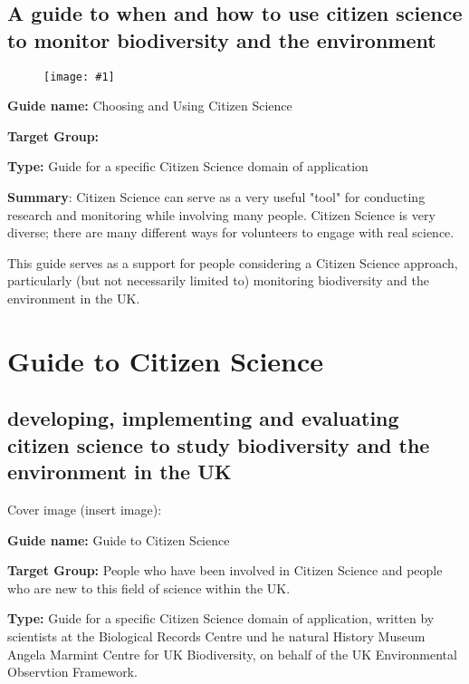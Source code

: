 \documentclass{article}
\newlength{\imgwidth}
\newcommand\scaledgraphics[2]{%
                
\settowidth{\imgwidth}{\texttt{[image: \#1]}}%
                
\setlength{\imgwidth}{\minof{\imgwidth}{#2\textwidth}}%
                
\texttt{[image: \#1]}%
                
}
\begin{document}
\subsection{A guide to when and how to use citizen science to monitor biodiversity and the environment}\label{H8816796}


\begin{figure}
\scaledgraphics{dba5d5eb-235c-4694-a2d4-c26b6e16182b.png}{0.5}
\label{F60064251}
\end{figure}


\textbf{Guide name: }Choosing and Using Citizen Science \autocite{pocock_choosing_2014}


\textbf{Target Group:}


\textbf{Type: }Guide for a specific Citizen Science domain of application


\textbf{Summary}: Citizen Science can serve as a very useful "tool" for conducting research and monitoring while involving many people. Citizen Science is very diverse; there are many different ways for volunteers to engage with real science.


This guide serves as a support for people considering a Citizen Science approach, particularly (but not necessarily limited to) monitoring biodiversity and the environment in the UK.


\section{Guide to Citizen Science}\label{H3514415}



\subsection{developing, implementing and evaluating citizen science to study biodiversity and the environment in the UK}\label{H903150}



Cover image (insert image):


\textbf{Guide name: }Guide to Citizen Science\textbf{ } \autocite{tweddle_guide_2012}


\textbf{Target Group: }People who have been involved in Citizen Science and people who are new to this field of science within the UK.


\textbf{Type: }Guide for a specific Citizen Science domain of application, written by scientists at the Biological Records Centre und he natural History Museum Angela Marmint Centre for UK Biodiversity, on behalf of the UK Environmental Observtion Framework.
\end{document}

